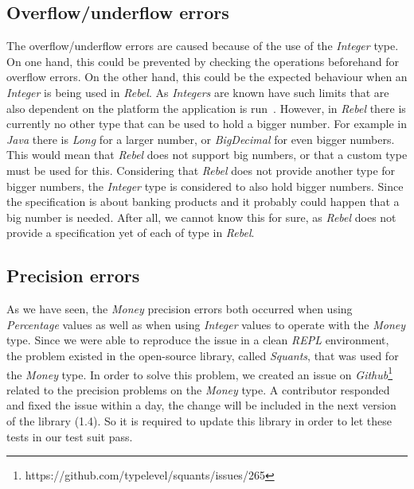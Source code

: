 \subsection*{Overflow/underflow errors}
The overflow/underflow errors are caused because of the use of the
\textit{Integer} type. On one hand, this could be prevented by checking the
operations beforehand for overflow errors. On the other hand, this could be the
expected behaviour when an \textit{Integer} is being used in \textit{Rebel}. As
\textit{Integers} are known have such limits that are also dependent on the
platform the application is run~\cite{wang2009intscope}. However, in
\textit{Rebel} there is currently no other type that can be used to hold a
bigger number. For example in \textit{Java} there is \textit{Long} for a larger
number, or \textit{BigDecimal} for even bigger numbers. This would mean that
\textit{Rebel} does not support big numbers, or that a custom type must be used
for this. Considering that \textit{Rebel} does not provide another type for
bigger numbers, the \textit{Integer} type is considered to also hold bigger
numbers. Since the specification is about banking products and it probably could
happen that a big number is needed. After all, we cannot know this for sure, as
\textit{Rebel} does not provide a specification yet of each of type in
\textit{Rebel}.

\subsection*{Precision errors}
As we have seen, the \textit{Money} precision errors both occurred when using
\textit{Percentage} values as well as when using \textit{Integer} values to
operate with the \textit{Money} type. Since we were able to reproduce the issue
in a clean \textit{REPL} environment, the problem existed in the open-source
library, called \textit{Squants}, that was used for the \textit{Money} type. In
order to solve this problem, we created an issue on
\textit{Github}\footnote{https://github.com/typelevel/squants/issues/265}
related to the precision problems on the \textit{Money} type. A contributor
responded and fixed the issue within a day, the change will be included in the
next version of the library (1.4). So it is required to update this library in
order to let these tests in our test suit pass.



